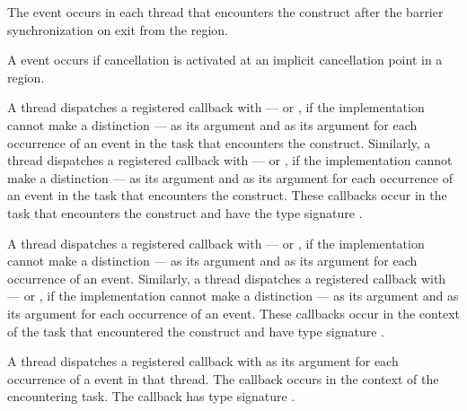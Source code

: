 The  event occurs in each thread that encounters the
 construct after the barrier synchronization on exit from the
 region.

A  event occurs if cancellation is activated at an implicit 
cancellation point in a  region.

\tools

A thread dispatches a registered 
callback with  --- or
, if the implementation cannot make a
distinction --- as its  argument and  
as its  argument for each occurrence of an  
event in the task that encounters the  construct. Similarly, 
a thread dispatches a registered  callback 
with  --- or , 
if the implementation cannot make a distinction --- as its  argument 
and  as its  argument for each  occurrence 
of an  event in the task that encounters the 
 construct. These callbacks occur in the task that encounters 
the  construct and have the type signature 
.

A thread dispatches a registered  callback
with  --- or , 
if the implementation cannot make a distinction --- as its  argument and
 as its  argument for each occurrence of 
an  event. Similarly, a thread dispatches a 
registered  callback with 
 --- or , 
if the implementation cannot make a distinction --- as its  argument and
 as its  argument for each occurrence of an 
 event. These callbacks occur in the context of 
the task that encountered the  construct and have type signature 
.

A thread dispatches a registered  callback with 
 as its  argument for each occurrence 
of a  event in that thread. The callback occurs in the 
context of the encountering task. The callback has type signature
. 

